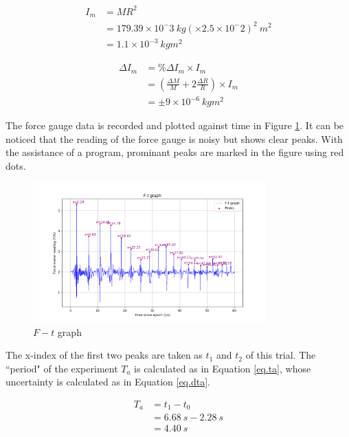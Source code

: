 \documentclass[a4paper]{article}
\begin{document}
\begin{equation}
    \begin{aligned}
        I_m &= MR^2 \\
            &= 179.39 \times 10^-3 \SI{}{kg} (\times 2.5 \times 10^-2)^2 \SI{}{m^2}\\
            &= 1.1\times 10^{-3}\SI{}{kgm^2}
    \end{aligned}
\end{equation}%

\begin{equation}
    \begin{aligned}
        \Delta I_m &= \%\Delta I_m \times I_m \\
            &= (\frac{\Delta M}{M} + 2\frac{\Delta R}{R})\times I_m\\
            &= \pm 9\times 10^{-6}\SI{}{kgm^2}
    \end{aligned} %
\end{equation}

The force gauge data is recorded and plotted against time in Figure \ref{fig.ft}. It can be noticed that the reading of the force gauge is noisy but shows clear peaks. With the assistance of a program, prominant peaks are marked in the figure using red dots.

\begin{figure}
    \centering
    \includegraphics[width = 0.8\textwidth]{graphft.png}
    \caption{$F - t$ graph}
    \label{fig.ft}
\end{figure}

The x-index of the first two peaks are taken as $t_1$ and $t_2$ of this trial. The ``period" of the experiment $T_a$ is calculated as in Equation \ref{eq.ta}, whose uncertainty is calculated as in Equation \ref{eq.dta}.

\begin{equation}
    \begin{aligned}
        T_a &= t_1 - t_0 \\
            &= \SI{6.68}{s} -  \SI{2.28}{s}\\
            &= \SI{4.40}{s}
    \end{aligned}
    \label{eq.ta}
\end{equation}
\end{document}
